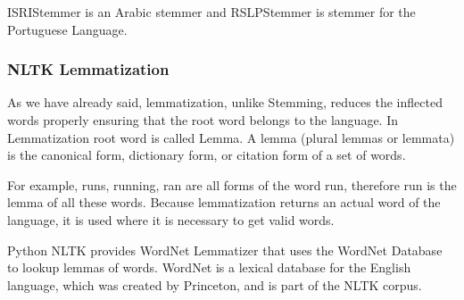 \documentclass[11pt]{article}
\begin{document}
ISRIStemmer is an Arabic stemmer and RSLPStemmer is stemmer for the
Portuguese Language.

    \hypertarget{nltk-lemmatization}{%
\subsubsection{NLTK Lemmatization}\label{nltk-lemmatization}}

    As we have already said, lemmatization, unlike Stemming, reduces the
inflected words properly ensuring that the root word belongs to the
language. In Lemmatization root word is called Lemma. A lemma (plural
lemmas or lemmata) is the canonical form, dictionary form, or citation
form of a set of words.

For example, runs, running, ran are all forms of the word run, therefore
run is the lemma of all these words. Because lemmatization returns an
actual word of the language, it is used where it is necessary to get
valid words.

Python NLTK provides WordNet Lemmatizer that uses the WordNet Database
to lookup lemmas of words. WordNet is a lexical database for the English
language, which was created by Princeton, and is part of the NLTK
corpus.
\end{document}
